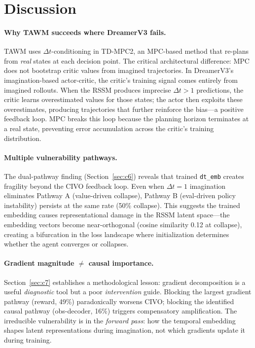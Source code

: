 \documentclass[letterpaper]{article}
\newcommand{\civo}{CIVO\xspace}
\newcommand{\dtemb}{\texttt{dt\_emb}\xspace}
\begin{document}
\section{Discussion}

\paragraph{Why TAWM succeeds where DreamerV3 fails.}
TAWM uses $\Delta t$-conditioning in TD-MPC2, an MPC-based method that re-plans from \emph{real} states at each decision point. The critical architectural difference: MPC does not bootstrap critic values from imagined trajectories. In DreamerV3's imagination-based actor-critic, the critic's training signal comes entirely from imagined rollouts. When the RSSM produces imprecise $\Delta t > 1$ predictions, the critic learns overestimated values for those states; the actor then exploits these overestimates, producing trajectories that further reinforce the bias---a positive feedback loop. MPC breaks this loop because the planning horizon terminates at a real state, preventing error accumulation across the critic's training distribution.

\paragraph{Multiple vulnerability pathways.}
The dual-pathway finding (Section~\ref{sec:c6}) reveals that trained \dtemb creates fragility beyond the \civo feedback loop. Even when $\Delta t = 1$ imagination eliminates Pathway A (value-driven collapse), Pathway B (eval-driven policy instability) persists at the same rate (50\% collapse). This suggests the trained embedding causes representational damage in the RSSM latent space---the embedding vectors become near-orthogonal (cosine similarity 0.12 at collapse), creating a bifurcation in the loss landscape where initialization determines whether the agent converges or collapses.

\paragraph{Gradient magnitude $\neq$ causal importance.}
Section~\ref{sec:c7} establishes a methodological lesson: gradient decomposition is a useful \emph{diagnostic} tool but a poor \emph{intervention} guide. Blocking the largest gradient pathway (reward, 49\%) paradoxically worsens \civo; blocking the identified causal pathway (obs-decoder, 16\%) triggers compensatory amplification. The irreducible vulnerability is in the \emph{forward pass}: how the temporal embedding shapes latent representations during imagination, not which gradients update it during training.
\end{document}
